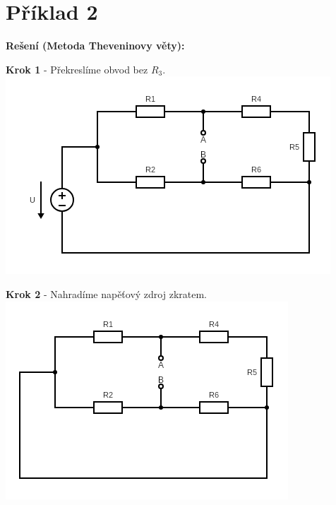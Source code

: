 \section{Příklad 2}

\vspace{1cm}
\large{\textbf{Rešení (Metoda Theveninovy věty):}}
\vspace{0.5cm}

\begin{center}
\textbf{Krok 1} - Překreslíme obvod bez $R_3$. \\
\includegraphics[scale=0.8,keepaspectratio]{fig/Pr2_steps/Pr2_step01.png}
\end{center}

\newpage

\begin{center}
\textbf{Krok 2} - Nahradíme napěťový zdroj zkratem. \\
\hspace{0.8cm}
\includegraphics[scale=0.8,keepaspectratio]{fig/Pr2_steps/Pr2_step02.png}
\end{center}
\vspace{0.5cm}

